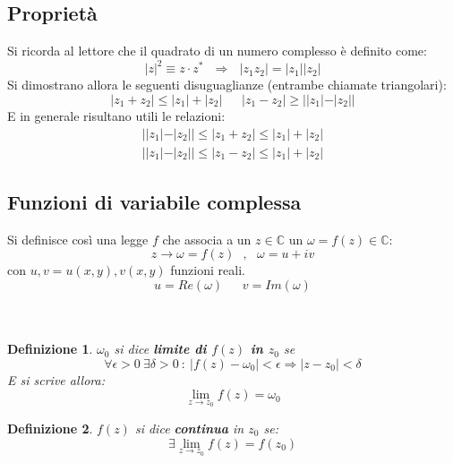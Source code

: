 \documentclass[twoside]{article}
\newtheorem{definition}{Definizione}[section]
\begin{document}
\subsection{Proprietà}
Si ricorda al lettore che il quadrato di un numero complesso è definito come:
\begin{equation}
    |z|^2\equiv z \cdot z^* \ \ \ \Rightarrow \ \ \ |z_1 z_2|=|z_1||z_2|
\end{equation}
Si dimostrano allora le seguenti disuguaglianze (entrambe chiamate triangolari):
\begin{equation}
    |z_1 +z_2| \leq |z_1| + |z_2| \ \ \ \ \ \ \ |z_1 - z_2| \geq ||z_1|-|z_2||
\end{equation}
E in generale risultano utili le relazioni:
\begin{equation}
    \begin{split}
       ||z_1|-|z_2|| \leq |z_1 +z_2| \leq |z_1|+|z_2| \\
       ||z_1|-|z_2|| \leq |z_1 - z_2| \leq |z_1|+|z_2|
    \end{split}
\end{equation}

\subsection{Funzioni di variabile complessa}
Si definisce così una legge $f$ che associa a un $z\in \mathds{C}$ un $\omega=f(z) \in \mathds{C}$:
\begin{equation}
    z\rightarrow\omega=f(z) \ \ \ , \ \ \ \omega=u+iv
\end{equation}
con $u,v=u(x,y),v(x,y)$ funzioni reali.
\begin{equation*}
    u=Re(\omega) \ \ \ \ \ \ \ v=Im(\omega)
\end{equation*}
\\ \\ 
\begin{definition} $\omega_0$ si dice \textbf{limite di $f(z)$ in $z_0$} se
\begin{equation}
    \forall \epsilon >0 \ \exists \delta >0 \ : \ |f(z)-\omega_0|<\epsilon \Rightarrow |z-z_0|<\delta
\end{equation}
E si scrive allora:
\begin{equation}
    \lim_{z \to z_0}f(z)=\omega_0
\end{equation}
\end{definition}

\begin{definition} $f(z)$ si dice \textbf{continua} in $z_0$ se:
\begin{equation}
    \exists \lim_{z \to z_0}f(z)=f(z_0)
\end{equation}
\end{definition}
\end{document}
